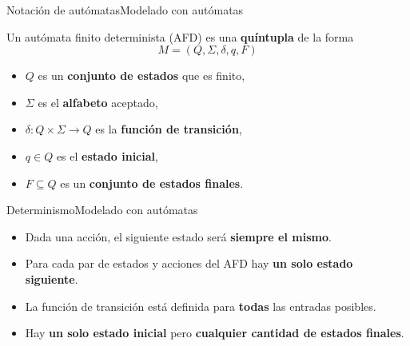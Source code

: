 \documentclass[spanish, handout]{beamer}
\begin{document}
\begin{frame}{Notación de autómatas}{Modelado con autómatas}
    \begin{definition}
        Un \alert{autómata finito determinista} (AFD) es una \textbf{quíntupla} de la forma
        \[M = (Q, \Sigma, \delta, q, F)\] \pause
        \begin{itemize}
            \item $Q$ es un \textbf{conjunto de estados} que es finito, \pause
            \item $\Sigma$ es el \textbf{alfabeto} aceptado, \pause
            \item $\delta : Q \times \Sigma \to Q$ es la \textbf{función de transición}, \pause
            \item $q \in Q$ es el \textbf{estado inicial}, \pause
            \item $F \subseteq Q$ es un \textbf{conjunto de estados finales}.
        \end{itemize}
    \end{definition}
\end{frame}

\begin{frame}{Determinismo}{Modelado con autómatas}
    \begin{itemize}
        \itemsep1.5ex
        \item Dada una acción, el siguiente estado será \textbf{siempre el mismo}. \pause
        \item Para cada par de estados y acciones del AFD hay \textbf{un solo estado siguiente}. \pause
        \item La función de transición está definida para \textbf{todas} las entradas posibles. \pause
        \item Hay \textbf{un solo estado inicial} pero \textbf{cualquier cantidad de estados finales}.
    \end{itemize}
    
\end{frame}



\end{document}
